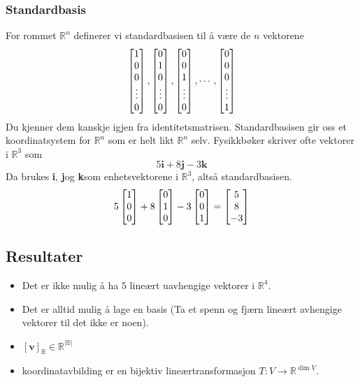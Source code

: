 \documentclass[12pt,a4paper,norsk]{article}
\makeatletter
\newcommand{\R}{\mathbb{R}}
\newcommand{\B}{\mathbb{B}}
\newcommand{\mat}[2]{\left[\begin{array}{@{}#1@{}}#2\end{array}\right]}
\newcommand{\vv}{\textbf{v}}
\newcommand{\vi}{\textbf{i}}
\newcommand{\vj}{\textbf{j}}
\newcommand{\vk}{\textbf{k}}
\makeatother
\begin{document}
\subsubsection{Standardbasis}
For rommet $\R^{n}$ definerer vi standardbasisen til å være de $n$ vektorene
\[\mat{c}{1\\0\\0\\ \vdots \\ 0}, \mat{c}{0\\1\\0\\ \vdots \\ 0}, \mat{c}{0\\0\\1\\ \vdots \\ 0}, \cdots, \mat{c}{0\\0\\0\\ \vdots \\ 1}\]
Du kjenner dem kanskje igjen fra identitetsmatrisen.
Standardbasisen gir oss et koordinatsystem for $\R^n$ som er helt likt $\R^n$ selv.
Fysikkbøker skriver ofte vektorer i $\R^3$ som
\[5\vi + 8\vj -3\vk\]
Da brukes \vi, \vj og \vk som enhetsvektorene i $\R^3$, altså standardbasisen.
\[5\mat{c}{1 \\ 0 \\ 0} + 8\mat{c}{0 \\ 1 \\ 0} -3\mat{c}{0 \\ 0 \\ 1} = \mat{c}{5 \\ 8 \\ -3}\]

\subsection{Resultater}
\begin{itemize}
  \item Det er ikke mulig å ha $5$ lineært uavhengige vektorer i $\R^{4}$.
  \item Det er alltid mulig å lage en basis (Ta et spenn og fjærn lineært
    avhengige vektorer til det ikke er noen).
  \item $[\vv]_\B \in \R^{|\B|}$
  \item koordinatavbilding er en bijektiv lineærtransformasjon $T:V\rightarrow \R^{\dim V}$.
\end{itemize}
\end{document}

